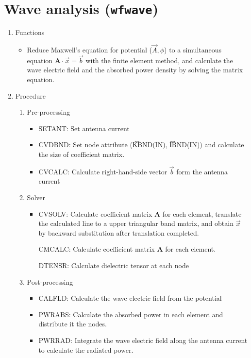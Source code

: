 \section{Wave analysis ({\tt wfwave})}
\begin{enumerate}
\item
Functions
\begin{itemize}
\item
Reduce Maxwell's equation for potential ($\vec{A}, \phi$) to a
simultaneous equation $\mathbf{A}\cdot\vec{x}=\vec{b}$ with the finite
element method, and calculate the wave electric field and the absorbed
power density by solving the matrix equation.
\end{itemize}

\item
Procedure
\begin{enumerate}
\item
Pre-processing
\begin{itemize}
\item
SETANT: Set antenna current
\item
CVDBND: Set node attribute (\t{KBND(IN)}, \t{IBND(IN)}) and calculate
the size of coefficient matrix.
\item
CVCALC: Calculate right-hand-side vector $\vec{b}$ form the antenna current
\end{itemize}
\item
Solver
\begin{itemize}
\item
CVSOLV: Calculate coefficient matrix $\mathbf{A}$ for each element,
translate the calculated line to a upper triangular band matrix, and
obtain $\vec{x}$ by backward substitution after translation completed.
\par\quad
CMCALC: Calculate coefficient matrix $\mathbf{A}$ for each element.
\par\quad\quad
DTENSR: Calculate dielectric tensor at each node
\end{itemize}
\item
Post-processing
\begin{itemize}
\item
CALFLD: Calculate the wave electric field from the potential
\item
PWRABS: Calculate the absorbed power in each element and distribute it the
nodes. 
\item
PWRRAD: Integrate the wave electric field along the antenna current to
calculate the radiated power. 
        \end{itemize}
\end{enumerate}
\end{enumerate}

